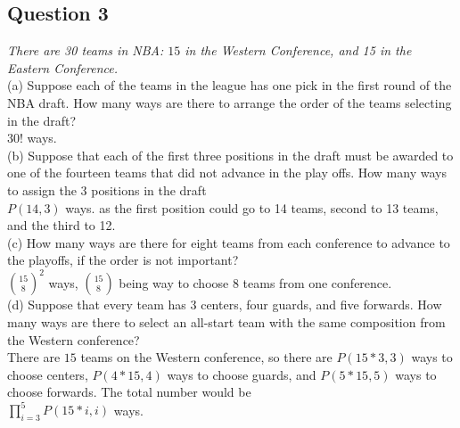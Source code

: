 \documentclass{article}
\begin{document}
\newpage
\subsection{Question 3}
\emph{There are 30 teams in NBA: $15$ in the Western Conference, and 15 in the Eastern Conference.}
\bigskip
\\
(a) Suppose each of the teams in the league has one pick in the first round of the NBA draft. How many ways are there to arrange the order of the teams selecting in the draft?
\medskip
\\
30! ways.
\bigskip
\\
(b) Suppose that each of the first three positions in the draft must be awarded to one of the fourteen teams that did not advance in the play offs. How many ways to assign the 3 positions in the draft
\medskip
\\
$P(14, 3)$ ways. as the first position could go to 14 teams, second to 13 teams, and the third to 12.
\bigskip
\\
(c) How many ways are there for eight teams from each conference to advance to the playoffs, if the order is not important?
\medskip
\\
${15\choose8}^2$ ways, ${15\choose8}$ being way to choose 8 teams from one conference.
\bigskip
\\
(d) Suppose that every team has 3 centers, four guards, and five forwards. How many ways are there to select an all-start team with the same composition from the Western conference?
\medskip
\\
There are $15$ teams on the Western conference, so there are $P(15*3, 3)$ ways to choose centers, $P(4*15, 4)$ ways to choose guards, and $P(5*15, 5)$ ways to choose forwards. The total number would be
\smallskip
\\ 
$\prod_{i=3}^5 P(15*i, i)$ ways.
\smallskip
\\
\end{document}
